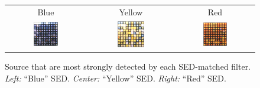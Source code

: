 \documentclass[letterpaper,preprint]{aastex62}
\begin{document}
\begin{figure}
  \begin{center}
    \begin{tabular}{@{}c@{}c@{}c@{}}
      Blue & Yellow & Red \\
      \includegraphics[width=0.33\textwidth]{best-blue} &
      \includegraphics[width=0.33\textwidth]{best-yellow} &
      \includegraphics[width=0.33\textwidth]{best-red}
    \end{tabular}
    \caption{Source that are most strongly detected by each
      SED-matched filter.  \emph{Left:} ``Blue'' SED.  \emph{Center:}
      ``Yellow'' SED.  \emph{Right:} ``Red'' SED.
    \label{fig:bestsed}}
  \end{center}
\end{figure}
\end{document}

